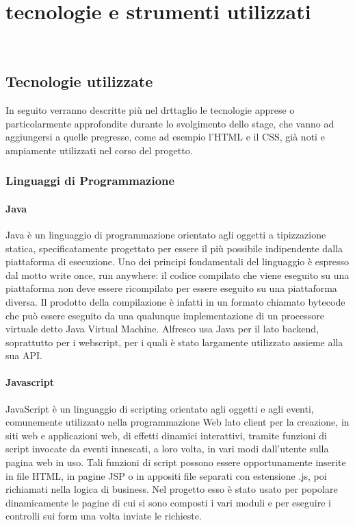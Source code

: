 
\chapter{tecnologie e strumenti utilizzati}
\label{cap:tecnologie-strumenti}

\\

\section{Tecnologie utilizzate}
In seguito verranno descritte più nel drttaglio le tecnologie apprese o particolarmente approfondite durante lo svolgimento dello stage, che vanno ad aggiungersi a quelle pregresse, come ad esempio l'HTML e il CSS, già noti e ampiamente utilizzati nel corso del progetto.
\subsection{Linguaggi di Programmazione}
\subsubsection{Java}
Java è un linguaggio di programmazione orientato agli oggetti a tipizzazione statica,
specificatamente progettato per essere il più possibile indipendente dalla piattaforma
di esecuzione. Uno dei principi fondamentali del linguaggio è espresso dal motto write
once, run anywhere: il codice compilato che viene eseguito su una piattaforma non
deve essere ricompilato per essere eseguito su una piattaforma diversa. Il prodotto
della compilazione è infatti in un formato chiamato bytecode che può essere eseguito da
una qualunque implementazione di un processore virtuale detto Java Virtual Machine.
Alfresco usa Java per il lato backend, soprattutto per i webscript, per i quali è stato largamente utilizzato assieme alla sua API.
\subsubsection{Javascript}
JavaScript è un linguaggio di scripting orientato agli oggetti e agli eventi, comunemente
utilizzato nella programmazione Web lato client per la creazione, in siti web e
applicazioni web, di effetti dinamici interattivi, tramite funzioni di script invocate da
eventi innescati, a loro volta, in vari modi dall’utente sulla pagina web in uso. Tali
funzioni di script possono essere opportunamente inserite in file HTML, in pagine JSP
o in appositi file separati con estensione .js, poi richiamati nella logica di business.
Nel progetto esso è stato usato per popolare dinamicamente le pagine di cui si sono composti i vari moduli e per eseguire i controlli sui form una volta inviate le richieste.

